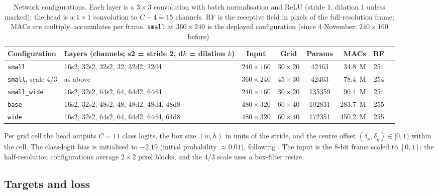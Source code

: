 \documentclass[11pt,a4paper]{article}
\newcommand{\cfg}[1]{\texttt{#1}}
\begin{document}
\begin{table}[h]
  \centering
  \small
  \setlength{\tabcolsep}{4pt}
  \begin{tabular}{llcccrrr}
    \toprule
    Configuration & Layers (channels; s2 = stride 2, d$k$ = dilation $k$) & Input & Grid & Params & MACs & RF \\
    \midrule
    \cfg{small} & 16s2, 32s2, 32s2, 32, 32d2, 32d4 & $240{\times}160$ & $30{\times}20$ & \num{42463} & \SI{34.8}{M} & 254 \\
    \cfg{small}, scale 4/3 & as above & $360{\times}240$ & $45{\times}30$ & \num{42463} & \SI{78.4}{M} & 254 \\
    \cfg{small\_wide} & 16s2, 32s2, 64s2, 64, 64d2, 64d4 & $240{\times}160$ & $30{\times}20$ & \num{135359} & \SI{90.4}{M} & 254 \\
    \cfg{base} & 16s2, 32s2, 48s2, 48, 48d2, 48d4, 48d8 & $480{\times}320$ & $60{\times}40$ & \num{102831} & \SI{283.7}{M} & 255 \\
    \cfg{wide} & 16s2, 32s2, 64s2, 64, 64d2, 64d4, 64d8 & $480{\times}320$ & $60{\times}40$ & \num{172351} & \SI{450.2}{M} & 255 \\
    \bottomrule
  \end{tabular}
  \caption{Network configurations. Each layer is a $3{\times}3$ convolution
  with batch normalisation and ReLU (stride 1, dilation 1 unless marked); the
  head is a $1{\times}1$ convolution to $C + 4 = 15$ channels. RF is the
  receptive field in pixels of the full-resolution frame; MACs are
  multiply--accumulates per frame. \cfg{small} at $360 \times 240$ is the
  deployed configuration (since 4 November; $240 \times 160$ before).}
  \label{tab:configs}
\end{table}

Per grid cell the head outputs $C = 11$ class logits, the box size $(w, h)$
in units of the stride, and the centre offset $(\delta_x, \delta_y) \in
[0, 1)$ within the cell. The class-logit bias is initialised to $-2.19$
(initial probability $\approx 0.01$), following \cite{zhou2019}. The input
is the 8-bit frame scaled to $[0, 1]$; the half-resolution configurations
average $2 \times 2$ pixel blocks, and the $4/3$ scale uses a box-filter
resize.

\subsection{Targets and loss}
\end{document}
